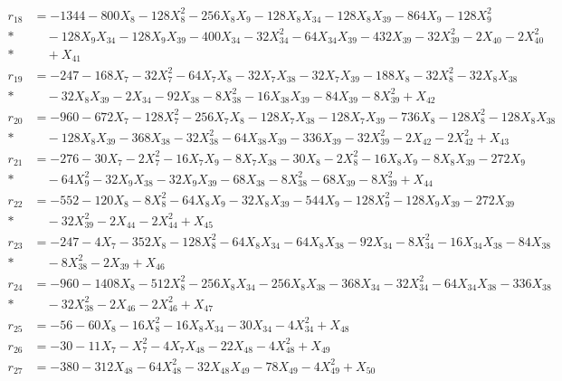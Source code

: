 \begin{align*}
r_{18} &= -1344 - 800X_{8} - 128X_{8}^{2} - 256X_{8}X_{9} - 128X_{8}X_{34} - 128X_{8}X_{39} - 864X_{9} - 128X_{9}^{2} \\*
&\quad  - 128X_{9}X_{34} - 128X_{9}X_{39} - 400X_{34} - 32X_{34}^{2} - 64X_{34}X_{39} - 432X_{39} - 32X_{39}^{2} - 2X_{40} - 2X_{40}^{2} \\*
&\quad  + X_{41} \\[3pt]
r_{19} &= -247 - 168X_{7} - 32X_{7}^{2} - 64X_{7}X_{8} - 32X_{7}X_{38} - 32X_{7}X_{39} - 188X_{8} - 32X_{8}^{2} - 32X_{8}X_{38} \\*
&\quad  - 32X_{8}X_{39} - 2X_{34} - 92X_{38} - 8X_{38}^{2} - 16X_{38}X_{39} - 84X_{39} - 8X_{39}^{2} + X_{42} \\[3pt]
r_{20} &= -960 - 672X_{7} - 128X_{7}^{2} - 256X_{7}X_{8} - 128X_{7}X_{38} - 128X_{7}X_{39} - 736X_{8} - 128X_{8}^{2} - 128X_{8}X_{38} \\*
&\quad  - 128X_{8}X_{39} - 368X_{38} - 32X_{38}^{2} - 64X_{38}X_{39} - 336X_{39} - 32X_{39}^{2} - 2X_{42} - 2X_{42}^{2} + X_{43} \\[3pt]
r_{21} &= -276 - 30X_{7} - 2X_{7}^{2} - 16X_{7}X_{9} - 8X_{7}X_{38} - 30X_{8} - 2X_{8}^{2} - 16X_{8}X_{9} - 8X_{8}X_{39} - 272X_{9} \\*
&\quad  - 64X_{9}^{2} - 32X_{9}X_{38} - 32X_{9}X_{39} - 68X_{38} - 8X_{38}^{2} - 68X_{39} - 8X_{39}^{2} + X_{44} \\[3pt]
r_{22} &= -552 - 120X_{8} - 8X_{8}^{2} - 64X_{8}X_{9} - 32X_{8}X_{39} - 544X_{9} - 128X_{9}^{2} - 128X_{9}X_{39} - 272X_{39} \\*
&\quad  - 32X_{39}^{2} - 2X_{44} - 2X_{44}^{2} + X_{45} \\[3pt]
r_{23} &= -247 - 4X_{7} - 352X_{8} - 128X_{8}^{2} - 64X_{8}X_{34} - 64X_{8}X_{38} - 92X_{34} - 8X_{34}^{2} - 16X_{34}X_{38} - 84X_{38} \\*
&\quad  - 8X_{38}^{2} - 2X_{39} + X_{46} \\[3pt]
r_{24} &= -960 - 1408X_{8} - 512X_{8}^{2} - 256X_{8}X_{34} - 256X_{8}X_{38} - 368X_{34} - 32X_{34}^{2} - 64X_{34}X_{38} - 336X_{38} \\*
&\quad  - 32X_{38}^{2} - 2X_{46} - 2X_{46}^{2} + X_{47} \\[3pt]
r_{25} &= -56 - 60X_{8} - 16X_{8}^{2} - 16X_{8}X_{34} - 30X_{34} - 4X_{34}^{2} + X_{48} \\[3pt]
r_{26} &= -30 - 11X_{7} - X_{7}^{2} - 4X_{7}X_{48} - 22X_{48} - 4X_{48}^{2} + X_{49} \\[3pt]
r_{27} &= -380 - 312X_{48} - 64X_{48}^{2} - 32X_{48}X_{49} - 78X_{49} - 4X_{49}^{2} + X_{50} \\[3pt]

\end{align*}
